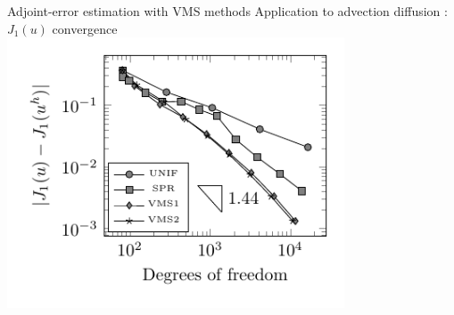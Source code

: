 \documentclass[fleqn]{beamer}
\begin{document}

\begin{frame}{Adjoint-error estimation with VMS methods}
{Application to advection diffusion : $J_1(u)$ convergence}
\includegraphics[width=0.75\textwidth]{../img/vms_lshape_global_convergence}
\end{frame}

\end{document}

